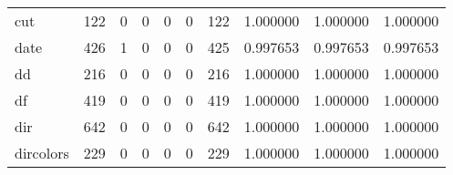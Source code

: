\begin{tabular}{lrrrrrrrrr}
cut       &                                                122 &                                                  0 &                                                  0 &                                                  0 &                                                  0 &                                                122 &                                           1.000000 &                               1.000000 &                             1.000000 \\
date      &                                                426 &                                                  1 &                                                  0 &                                                  0 &                                                  0 &                                                425 &                                           0.997653 &                               0.997653 &                             0.997653 \\
dd        &                                                216 &                                                  0 &                                                  0 &                                                  0 &                                                  0 &                                                216 &                                           1.000000 &                               1.000000 &                             1.000000 \\
df        &                                                419 &                                                  0 &                                                  0 &                                                  0 &                                                  0 &                                                419 &                                           1.000000 &                               1.000000 &                             1.000000 \\
dir       &                                                642 &                                                  0 &                                                  0 &                                                  0 &                                                  0 &                                                642 &                                           1.000000 &                               1.000000 &                             1.000000 \\
dircolors &                                                229 &                                                  0 &                                                  0 &                                                  0 &                                                  0 &                                                229 &                                           1.000000 &                               1.000000 &                             1.000000 \\

\end{tabular}

